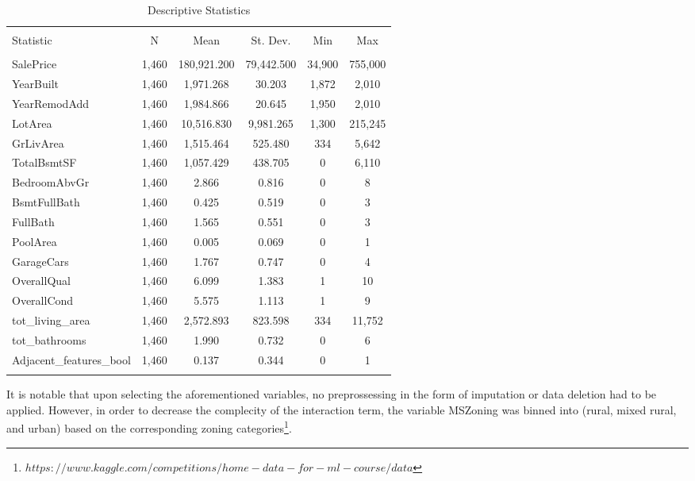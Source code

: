 \documentclass{article}
\begin{document}
\begin{center}
\begin{table}[!htbp] \centering 
  \caption{Descriptive Statistics} 
  \label{} 
\begin{tabular}{@{\extracolsep{5pt}}lccccc} 
\\[-1.8ex]\hline 
\hline \\[-1.8ex] 
Statistic & \multicolumn{1}{c}{N} & \multicolumn{1}{c}{Mean} & \multicolumn{1}{c}{St. Dev.} & \multicolumn{1}{c}{Min} & \multicolumn{1}{c}{Max} \\ 
\hline \\[-1.8ex] 
SalePrice & 1,460 & 180,921.200 & 79,442.500 & 34,900 & 755,000 \\ 
YearBuilt & 1,460 & 1,971.268 & 30.203 & 1,872 & 2,010 \\ 
YearRemodAdd & 1,460 & 1,984.866 & 20.645 & 1,950 & 2,010 \\ 
LotArea & 1,460 & 10,516.830 & 9,981.265 & 1,300 & 215,245 \\ 
GrLivArea & 1,460 & 1,515.464 & 525.480 & 334 & 5,642 \\ 
TotalBsmtSF & 1,460 & 1,057.429 & 438.705 & 0 & 6,110 \\ 
BedroomAbvGr & 1,460 & 2.866 & 0.816 & 0 & 8 \\ 
BsmtFullBath & 1,460 & 0.425 & 0.519 & 0 & 3 \\ 
FullBath & 1,460 & 1.565 & 0.551 & 0 & 3 \\ 
PoolArea & 1,460 & 0.005 & 0.069 & 0 & 1 \\ 
GarageCars & 1,460 & 1.767 & 0.747 & 0 & 4 \\ 
OverallQual & 1,460 & 6.099 & 1.383 & 1 & 10 \\ 
OverallCond & 1,460 & 5.575 & 1.113 & 1 & 9 \\ 
tot\_living\_area & 1,460 & 2,572.893 & 823.598 & 334 & 11,752 \\ 
tot\_bathrooms & 1,460 & 1.990 & 0.732 & 0 & 6 \\ 
Adjacent\_features\_bool & 1,460 & 0.137 & 0.344 & 0 & 1 \\ 
\hline \\[-1.8ex] 
\end{tabular} 
\end{table} 
\end{center}

It is notable that upon selecting the aforementioned variables, no preprossessing in the form of imputation or data deletion had to be applied. However, in order to decrease the complecity of the interaction term, the variable MSZoning was binned into (rural, mixed rural, and urban) based on the corresponding zoning categories\footnote{$https://www.kaggle.com/competitions/home-data-for-ml-course/data$}.
\end{document}
